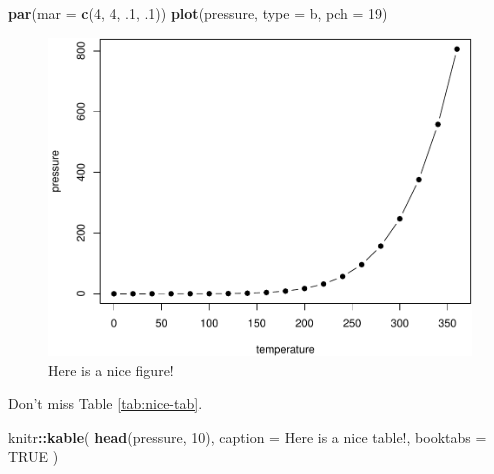 \documentclass[
]{book}
\newenvironment{Shaded}{\begin{snugshade}}{\end{snugshade}}
\newcommand{\AttributeTok}[1]{\textcolor[rgb]{0.13,0.29,0.53}{#1}}
\newcommand{\ConstantTok}[1]{\textcolor[rgb]{0.56,0.35,0.01}{#1}}
\newcommand{\DecValTok}[1]{\textcolor[rgb]{0.00,0.00,0.81}{#1}}
\newcommand{\FunctionTok}[1]{\textcolor[rgb]{0.13,0.29,0.53}{\textbf{#1}}}
\newcommand{\NormalTok}[1]{#1}
\newcommand{\SpecialCharTok}[1]{\textcolor[rgb]{0.81,0.36,0.00}{\textbf{#1}}}
\newcommand{\StringTok}[1]{\textcolor[rgb]{0.31,0.60,0.02}{#1}}
\theoremstyle{definition}
\theoremstyle{definition}
\theoremstyle{definition}
\theoremstyle{definition}
\theoremstyle{remark}
\begin{document}
\begin{Shaded}
\begin{Highlighting}[]
\FunctionTok{par}\NormalTok{(}\AttributeTok{mar =} \FunctionTok{c}\NormalTok{(}\DecValTok{4}\NormalTok{, }\DecValTok{4}\NormalTok{, .}\DecValTok{1}\NormalTok{, .}\DecValTok{1}\NormalTok{))}
\FunctionTok{plot}\NormalTok{(pressure, }\AttributeTok{type =} \StringTok{\textquotesingle{}b\textquotesingle{}}\NormalTok{, }\AttributeTok{pch =} \DecValTok{19}\NormalTok{)}
\end{Highlighting}
\end{Shaded}

\begin{figure}

{\centering \includegraphics[width=0.8\linewidth]{_main_files/figure-latex/nice-fig-1} 

}

\caption{Here is a nice figure!}\label{fig:nice-fig}
\end{figure}

Don't miss Table \ref{tab:nice-tab}.

\begin{Shaded}
\begin{Highlighting}[]
\NormalTok{knitr}\SpecialCharTok{::}\FunctionTok{kable}\NormalTok{(}
  \FunctionTok{head}\NormalTok{(pressure, }\DecValTok{10}\NormalTok{), }\AttributeTok{caption =} \StringTok{\textquotesingle{}Here is a nice table!\textquotesingle{}}\NormalTok{,}
  \AttributeTok{booktabs =} \ConstantTok{TRUE}
\NormalTok{)}
\end{Highlighting}
\end{Shaded}
\end{document}
